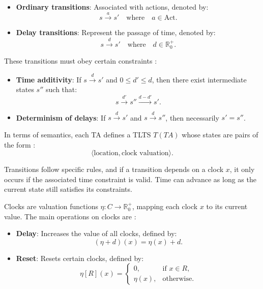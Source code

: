 \begin{itemize}
    \item \textbf{Ordinary transitions}: Associated with actions, denoted by:
    \[
        s \xrightarrow{a} s' \quad \text{where} \quad a \in \text{Act}.
    \]
    \item \textbf{Delay transitions}: Represent the passage of time, denoted by:
    \[
        s \xrightarrow{d} s' \quad \text{where} \quad d \in \mathbb{R}^+_0.
    \]
\end{itemize}

These transitions must obey certain constraints \cite{baier2008principles}:

\begin{itemize}
    \item \textbf{Time additivity}: If \( s \xrightarrow{d} s' \) and \( 0 \leq d' \leq d \), then there exist intermediate states \( s'' \) such that:
    \[
        s \xrightarrow{d'} s'' \xrightarrow{d - d'} s'.
    \]
    \item \textbf{Determinism of delays}: If \( s \xrightarrow{d} s' \) and \( s \xrightarrow{d} s'' \), then necessarily \( s' = s'' \).
\end{itemize}

In terms of semantics, each TA defines a TLTS \( T(TA) \) whose states are pairs of the form \cite{baier2008principles}:
\[
    \langle \text{location}, \text{clock valuation} \rangle.
\]

Transitions follow specific rules, and if a transition depends on a clock \( x \), it only occurs if the associated time constraint is valid. Time can advance as long as the current state still satisfies its constraints.

Clocks are valuation functions \( \eta: C \to \mathbb{R}^+_0 \), mapping each clock \( x \) to its current value. The main operations on clocks are \cite{baier2008principles}:

\begin{itemize}
    \item \textbf{Delay}: Increases the value of all clocks, defined by:
    \[
        (\eta + d)(x) = \eta(x) + d.
    \]
    \item \textbf{Reset}: Resets certain clocks, defined by:
    \[
        \eta[R](x) = 
        \begin{cases}
            0, & \text{if } x \in R, \\
            \eta(x), & \text{otherwise}.
        \end{cases}
    \]
\end{itemize}

